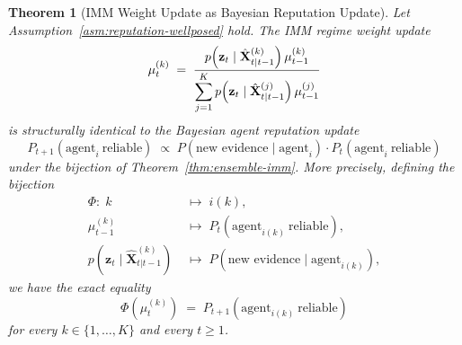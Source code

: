 \documentclass[12pt,openany]{book}
\numberwithin{equation}{chapter}
\theoremstyle{plain}
\newtheorem{theorem}{Theorem}[chapter]
\theoremstyle{definition}
\theoremstyle{remark}
\begin{document}
\begin{theorem}[IMM Weight Update as Bayesian Reputation Update]
\label{thm:imm-reputation}
Let Assumption~\ref{asm:reputation-wellposed} hold.
The IMM regime weight update
\begin{equation}
  \mu_t^{(k)} \;=\;
  \frac{%
    p\!\left(\mathbf{z}_t \mid
      \hat{\mathbf{X}}_{t|t-1}^{(k)}\right)
    \mu_{t-1}^{(k)}}
       {\displaystyle\sum_{j=1}^{K}
        p\!\left(\mathbf{z}_t \mid
          \hat{\mathbf{X}}_{t|t-1}^{(j)}\right)
        \mu_{t-1}^{(j)}}
  \label{eq:imm-weight-update}
\end{equation}
is structurally identical to the Bayesian agent reputation update
\begin{equation}
  P_{t+1}\!\left(\text{agent}_i\ \text{reliable}\right)
  \;\propto\;
  P\!\left(\text{new evidence} \mid \text{agent}_i\right)
  \cdot
  P_t\!\left(\text{agent}_i\ \text{reliable}\right)
  \label{eq:reputation-update-imm}
\end{equation}
under the bijection of Theorem~\ref{thm:ensemble-imm}.
More precisely, defining the bijection
\begin{align}
  \Phi\colon\; k &\;\longmapsto\; i(k),
  \label{eq:rep-bijection-index}\\
  \mu_{t-1}^{(k)} &\;\longmapsto\;
    P_t\!\left(\text{agent}_{i(k)}\ \text{reliable}\right),
  \label{eq:rep-bijection-prior}\\
  p\!\left(\mathbf{z}_t \mid
    \hat{\mathbf{X}}_{t|t-1}^{(k)}\right)
  &\;\longmapsto\;
  P\!\left(\text{new evidence} \mid \text{agent}_{i(k)}\right),
  \label{eq:rep-bijection-likelihood}
\end{align}
we have the exact equality
\begin{equation}
  \Phi\!\left(\mu_t^{(k)}\right)
  \;=\;
  P_{t+1}\!\left(\text{agent}_{i(k)}\ \text{reliable}\right)
  \label{eq:rep-exact-equality}
\end{equation}
for every $k \in \{1,\ldots,K\}$ and every $t \geq 1$.
\end{theorem}
\end{document}
